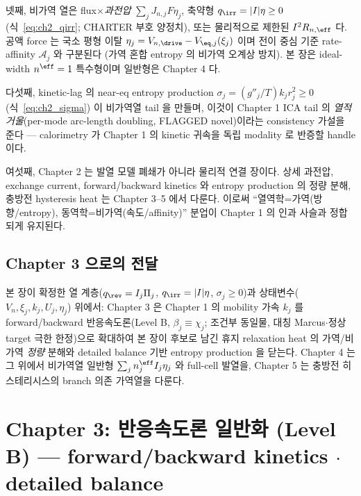 넷째, 비가역 열은 flux$\times$\emph{과전압} $\sum_jJ_{n,j}F\eta_j$, 축약형 $q_\irr=|I|\eta\ge0$
(식~\eqref{eq:ch2_qirr}; CHARTER 부호 양정치), 또는 물리적으로 제한된 $I^2R_{n,\eff}$ 다. 공액 force 는 국소
평형 이탈 $\eta_j=V_{n,\drive}-V_{\eq,j}(\xi_j)$ 이며 전이 중심 기준 rate-affinity $\mathcal A_j$ 와 구분된다
(가역 혼합 entropy 의 비가역 오계상 방지). 본 장은 ideal-width $n^\eff=1$ 특수형이며 일반형은 Chapter 4 다.

다섯째, kinetic-lag 의 near-eq entropy production $\sigma_j=(g''_j/T)k_j r_j^2\ge0$ (식~\eqref{eq:ch2_sigma})
이 비가역열 tail 을 만들며, 이것이 Chapter 1 ICA tail 의 \emph{열적 거울}(per-mode arc-length doubling, FLAGGED
novel)이라는 consistency 가설을 준다 — calorimetry 가 Chapter 1 의 kinetic 귀속을 독립 modality 로 반증할
handle 이다.

여섯째, Chapter 2 는 발열 모델 폐쇄가 아니라 물리적 연결 장이다. 상세 과전압, exchange current,
forward/backward kinetics 와 entropy production 의 정량 분해, 충방전 hysteresis heat 는 Chapter 3--5 에서
다룬다. 이로써 ``열역학=가역(방향/entropy), 동역학=비가역(속도/affinity)'' 분업이 Chapter 1 의 인과 사슬과
정합되게 유지된다.

\subsection*{Chapter 3 으로의 전달}
본 장이 확정한 열 계층($q_\rev=I_j\Pi_j$, $q_\irr=|I|\eta$, $\sigma_j\ge0$)과 상태변수($V_n,\xi_j,k_j,U_j,
\eta_j$) 위에서: Chapter 3 은 Chapter 1 의 mobility 가속 $k_j$ 를 forward/backward 반응속도론(Level B,
$\beta_j\equiv\chi_j$; 조건부 동일물, 대칭 Marcus$\cdot$정상 target 극한 한정)으로 확대하여 본 장이 후보로 남긴 휴지 relaxation heat 의 가역/비가역 \emph{정량} 분해와
detailed balance 기반 entropy production 을 닫는다. Chapter 4 는 그 위에서 비가역열 일반형
$\sum_j n_j^{\eff}I_j\eta_j$ 와 full-cell 발열을, Chapter 5 는 충방전 히스테리시스의 branch 의존 가역열을 다룬다.



\clearpage
\section{Chapter 3: 반응속도론 일반화 (Level B) — forward/backward kinetics $\cdot$ detailed balance}\label{chap:ch3}


